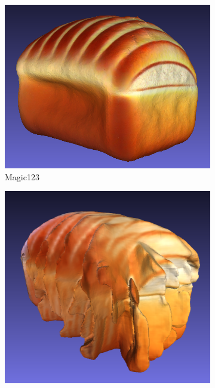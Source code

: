 \begin{figure}[ht]
    \begin{subfigure}[b]{0.269\textwidth}
        \centering
        \includegraphics[width=\textwidth]{figures/subjective/magic123_bread_result.png}
        \caption{Magic123}
        \vspace{0.1cm}
    \end{subfigure}
    \begin{subfigure}[b]{0.23\textwidth}
        \centering
        \includegraphics[width=\textwidth]{figures/subjective/wonder3d_bread_result.png}

\end{subfigure}
\end{figure}
